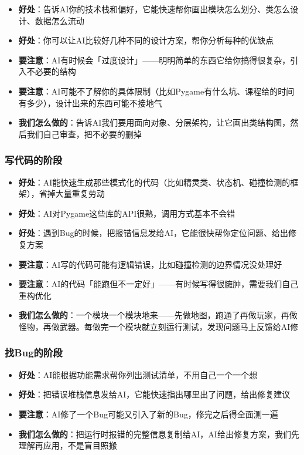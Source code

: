\documentclass[12pt,a4paper]{article}
\begin{document}
\begin{itemize}[leftmargin=2em]
    \item \textbf{好处}：告诉AI你的技术栈和偏好，它能快速帮你画出模块怎么划分、类怎么设计、数据怎么流动
    \item \textbf{好处}：你可以让AI比较好几种不同的设计方案，帮你分析每种的优缺点
    \item \textbf{要注意}：AI有时候会「过度设计」——明明简单的东西它给你搞得很复杂，引入不必要的结构
    \item \textbf{要注意}：AI可能不了解你的具体限制（比如Pygame有什么坑、课程给的时间有多少），设计出来的东西可能不接地气
    \item \textbf{我们怎么做的}：告诉AI我们要用面向对象、分层架构，让它画出类结构图，然后我们自己审查，把不必要的删掉
\end{itemize}

\subsubsection{写代码的阶段}

\begin{itemize}[leftmargin=2em]
    \item \textbf{好处}：AI能快速生成那些模式化的代码（比如精灵类、状态机、碰撞检测的框架），省掉大量重复劳动
    \item \textbf{好处}：AI对Pygame这些库的API很熟，调用方式基本不会错
    \item \textbf{好处}：遇到Bug的时候，把报错信息发给AI，它能很快帮你定位问题、给出修复方案
    \item \textbf{要注意}：AI写的代码可能有逻辑错误，比如碰撞检测的边界情况没处理好
    \item \textbf{要注意}：AI的代码「能跑但不一定好」——有时候写得很臃肿，需要我们自己重构优化
    \item \textbf{我们怎么做的}：一个模块一个模块地来——先做地图，跑通了再做玩家，再做怪物，再做武器。每做完一个模块就立刻运行测试，发现问题马上反馈给AI修
\end{itemize}

\subsubsection{找Bug的阶段}

\begin{itemize}[leftmargin=2em]
    \item \textbf{好处}：AI能根据功能需求帮你列出测试清单，不用自己一个一个想
    \item \textbf{好处}：把错误堆栈信息发给AI，它能快速指出哪里出了问题，给出修复建议
    \item \textbf{要注意}：AI修了一个Bug可能又引入了新的Bug，修完之后得全面测一遍
    \item \textbf{我们怎么做的}：把运行时报错的完整信息复制给AI，AI给出修复方案，我们先理解再应用，不是盲目照搬
\end{itemize}
\end{document}
